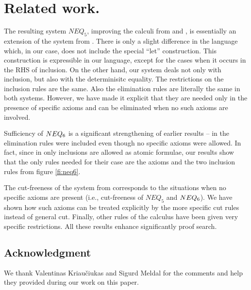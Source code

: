 %

\section{Related work.}\label{se:related}
The resulting system $NEQ_5$, improving the calculi from \cite{WM} and
\cite{Top}, is essentially an extension of the system from
\cite{BK95}. There is only a slight difference in the language which, in our case,
does not include the special ``let'' construction. This construction is
expressible in our language, except for the cases when it occurs in the RHS
of inclusion. On the other hand, our system
deals not only with inclusion, but also with the determinisitc equality.
The restrictions on the inclusion rules are the same.
Also the elimination rules are literally the same in both systems. 
However, we have
made it explicit that they are needed only in the presence of specific axioms
and can be eliminated when no such axioms are involved. 

Sufficiency of $NEQ_6$ is a significant
strengthening of earlier results -- in \cite{BK95} the elimination rules were included
even though no specific axioms were allowed. In fact, since in \cite{BK95}
only inclusions are allowed as atomic formulae, our results show that the
only rules needed for their case are the axioms and the two inclusion rules
from figure \ref{fi:neq6}.

The cut-freeness of the system from \cite{BK95} corresponds to the situations when
no specific axioms are present (i.e., cut-freeness of $NEQ_5$ and $NEQ_6$). 
We have shown how such axioms can be treated explicitly by
the more specific cut rules instead of general cut. Finally, other rules of the calculus have
been given very specific restrictions. All these results enhance significantly proof search.

\subsection*{Acknowledgment}
We thank Valentinas Kriau\v ciukas and Sigurd
Meldal for the comments and help they provided during our work on this paper.


